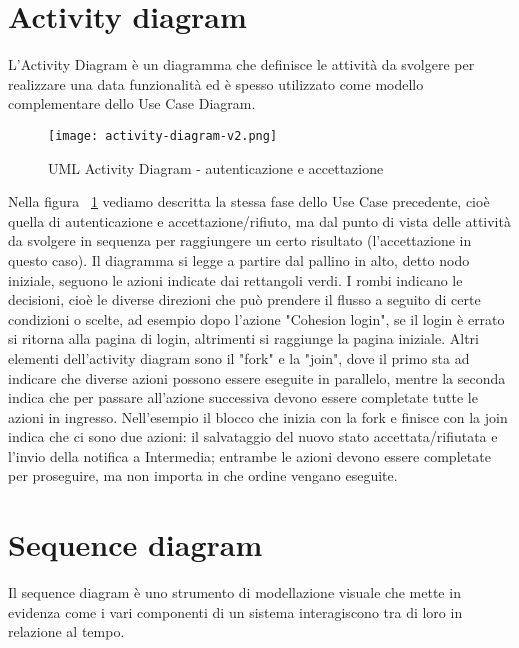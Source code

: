 
\newpage

\section{Activity diagram}

L'Activity Diagram è un diagramma che definisce le attività da svolgere per realizzare una data funzionalità ed è spesso utilizzato come modello complementare dello Use Case Diagram.

\begin{figure}[H]
    \centering
    \texttt{[image: activity-diagram-v2.png]}
    \caption{UML Activity Diagram - autenticazione e accettazione}
    \label{fig:ActivityDiagram1}
\end{figure}

Nella figura ~\ref{fig:ActivityDiagram1} vediamo descritta la stessa fase dello Use Case precedente, cioè quella di autenticazione e accettazione/rifiuto, ma dal punto di vista delle attività da svolgere in sequenza per raggiungere un certo risultato (l'accettazione in questo caso).
Il diagramma si legge a partire dal pallino in alto, detto nodo iniziale, seguono le azioni indicate dai rettangoli verdi.
I rombi indicano le decisioni, cioè le diverse direzioni che può prendere il flusso a seguito di certe condizioni o scelte, ad esempio dopo l'azione "Cohesion login", se il login è errato si ritorna alla pagina di login, altrimenti si raggiunge la pagina iniziale.
Altri elementi dell'activity diagram sono il "fork" e la "join", dove il primo sta ad indicare che diverse azioni possono essere eseguite in parallelo, mentre la seconda indica che per passare all'azione successiva devono essere completate tutte le azioni in ingresso.
Nell'esempio il blocco che inizia con la fork e finisce con la join indica che ci sono due azioni: il salvataggio del nuovo stato accettata/rifiutata e l'invio della notifica a Intermedia; entrambe le azioni devono essere completate per proseguire, ma non importa in che ordine vengano eseguite.


\newpage

\section{Sequence diagram}

Il sequence diagram è uno strumento di modellazione visuale che mette in evidenza come i vari componenti di un sistema interagiscono tra di loro in relazione al tempo.

